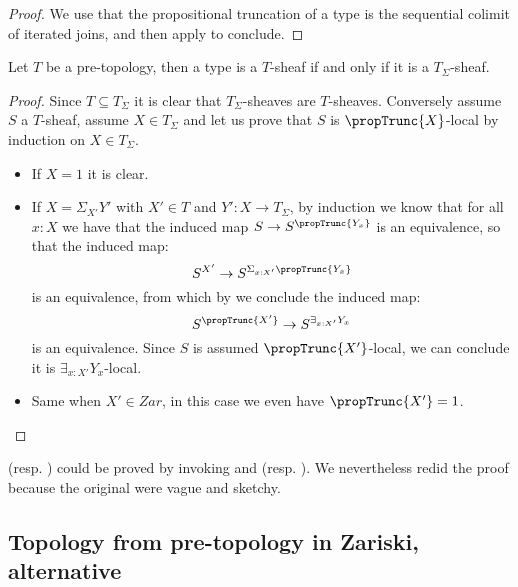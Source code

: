 \begin{proof}
We use that the propositional truncation of a type is the sequential colimit of iterated joins, and then apply  to conclude.
\end{proof}

\begin{lemma}\label{Tsigma-sheaf-generated}
Let $T$ be a pre-topology, then a type is a $T$-sheaf if and only if it is a $T_\Sigma$-sheaf.
\end{lemma}

\begin{proof}
Since $T\subseteq T_\Sigma$ it is clear that $T_\Sigma$-sheaves are $T$-sheaves. Conversely assume $S$ a $T$-sheaf, assume $X\in T_\Sigma$ and let us prove that $S$ is $\propTrunc{X}$-local by induction on $X\in T_\Sigma$.
\begin{itemize}
\item If $X=1$ it is clear.
\item If $X=\Sigma_{X'}Y'$ with $X'\in T$ and $Y':X\to T_\Sigma$, by induction we know that for all $x:X$ we have that the induced map $S\to S^{\propTrunc{Y_x}}$ is an equivalence, so that the induced map:
\[S^{X'}\to S^{\Sigma_{x:X'}\propTrunc{Y_x}}\] 
is an equivalence, from which by  we conclude the induced map:
\[S^{\propTrunc{X'}}\to S^{\exists_{x:X'}Y_x}\]
is an equivalence. Since $S$ is assumed $\propTrunc{X'}$-local, we can conclude it is $\exists_{x:X'}Y_x$-local. %
\item Same when $X'\in Zar$, in this case we even have $\propTrunc{X'}=1$.
\end{itemize}
\end{proof}

\begin{remark}
 (resp. ) could be proved by invoking  and  (resp. ). We nevertheless redid the proof because the original were vague and sketchy.
\end{remark}


\subsection{Topology from pre-topology in Zariski, alternative}
\label{topology-from-pretopology}

